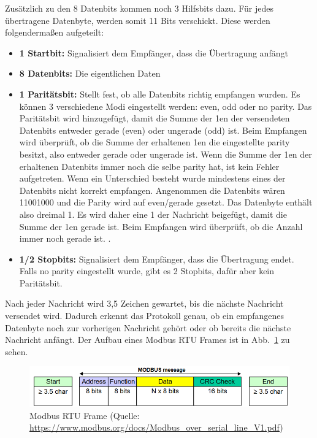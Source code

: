 Zusätzlich zu den 8 Datenbits kommen noch 3 Hilfsbits dazu. Für jedes übertragene Datenbyte, werden somit 11 Bits verschickt. Diese werden folgendermaßen aufgeteilt:
\begin{itemize}
	\item \textbf{1 Startbit:} Signalisiert dem Empfänger, dass die Übertragung anfängt
	\item \textbf{8 Datenbits:} Die eigentlichen Daten	
	\item \textbf{1 Paritätsbit:} Stellt fest, ob alle Datenbits richtig empfangen wurden. Es können 3 verschiedene Modi eingestellt werden: even, odd oder no parity. Das Paritätsbit wird hinzugefügt, damit die Summe der 1en der versendeten Datenbits entweder gerade (even) oder ungerade (odd) ist. Beim Empfangen wird überprüft, ob die Summe der erhaltenen 1en die eingestellte \gls{parity} besitzt, also entweder gerade oder ungerade ist. Wenn die Summe der 1en der erhaltenen Datenbits immer noch die selbe \gls{parity} hat, ist kein Fehler aufgetreten. Wenn ein Unterschied besteht wurde mindestens eines der Datenbits nicht korrekt empfangen. Angenommen die Datenbits wären 11001000 und die Parity wird auf even/gerade gesetzt. Das Datenbyte enthält also dreimal 1. Es wird daher eine 1 der Nachricht beigefügt, damit die Summe der 1en gerade ist. Beim Empfangen wird überprüft, ob die Anzahl immer noch gerade ist. \cite{IBM_Corporation:2023}.	 
	\item \textbf{1/2 Stopbits:} Signalisiert dem Empfänger, dass die Übertragung endet. Falls no parity eingestellt wurde, gibt es 2 Stopbits, dafür aber kein Paritätsbit.
\end{itemize}

Nach jeder Nachricht wird 3,5 Zeichen gewartet, bis die nächste Nachricht versendet wird. Dadurch erkennt das Protokoll genau, ob ein empfangenes Datenbyte noch zur vorherigen Nachricht gehört oder ob bereits die nächste Nachricht anfängt.
Der Aufbau eines Modbus RTU Frames ist in Abb.~\ref{fig:modbus_frame} zu sehen.
\begin{figure}[H]
	\centering
	\includegraphics[width=1.0\linewidth]{Bilder/Modbus_frame}
	\caption{Modbus RTU Frame (Quelle: \url{https://www.modbus.org/docs/Modbus_over_serial_line_V1.pdf})}
	\label{fig:modbus_frame}
\end{figure}


